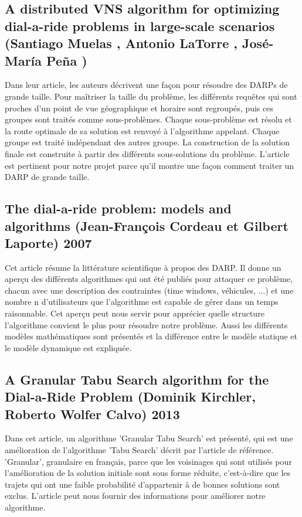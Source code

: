 \documentclass[11pt,a4paper]{report}
\begin{document}
 \subsection*{A distributed VNS algorithm for optimizing dial-a-ride
problems in large-scale scenarios (Santiago Muelas , Antonio LaTorre , José-María Peña )}
Dans leur article, les auteurs décrivent une façon pour résoudre des DARPs de grande taille. Pour maîtriser la taille du problème, les différents requêtes qui sont proches d'un point de vue géographique et horaire sont regroupés, puis ces groupes sont traités comme sous-problèmes. Chaque sous-problème est résolu et la route optimale de sa solution est renvoyé à l'algorithme appelant. Chaque groupe est traité indépendant des autres groupe. La construction de la solution finale est construite à partir des différents sous-solutions du problème. L'article est pertinent pour notre projet parce qu'il montre une façon comment traiter un DARP de grande taille.
\subsection*{The dial-a-ride problem: models and algorithms     (Jean-François Cordeau et Gilbert Laporte) 2007}
Cet article résume la littérature scientifique à propos des DARP. Il donne un aperçu des différents algorithmes qui ont été publiés pour attaquer ce problème, chacun avec une description des contraintes (time windows, véhicules, ...) et une nombre n d'utilisateurs que l'algorithme est capable de gérer dans un temps raisonnable. Cet aperçu peut nous servir pour apprécier quelle structure l'algorithme convient le plus pour résoudre notre problème. Aussi les différents modèles mathématiques sont présentés et la différence entre le modèle statique et le modèle dynamique est expliquée.
\subsection*{A Granular Tabu Search algorithm for the Dial-a-Ride Problem (Dominik Kirchler, Roberto Wolfer Calvo) 2013}
Dans cet article, un algorithme 'Granular Tabu Search' est présenté, qui est une amélioration de l'algorithme 'Tabu Search' décrit par l'article de référence. 'Granular', granulaire en français, parce que les voisinages qui sont utilisés pour l'amélioration de la solution initiale sont sous forme réduite, c'est-à-dire que les trajets qui ont une faible probabilité d'appartenir à de bonnes solutions sont exclus. L'article peut nous fournir des informations pour améliorer notre algorithme.
\end{document}
